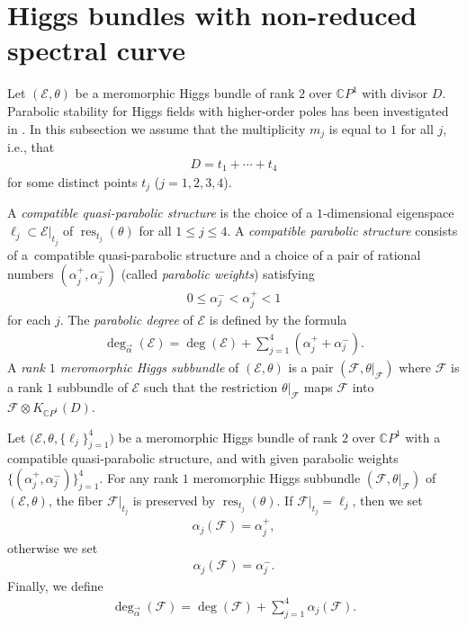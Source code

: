 \documentclass[10pt,a4paper]{amsart}
\newcommand{\CP}[1]{\mathbb{C}P^{#1}} %
\newcommand{\E}{{\mathcal E}} %
\newcommand{\F}{{\mathcal F}} %
\newcommand{\pardeg}{\deg_{\vec{\alpha}}}
\DeclareMathOperator{\res}{res}
\numberwithin{equation}{section}
\begin{document}
\section{Higgs bundles with non-reduced spectral curve}\label{s:parabolic}

Let $(\E , \theta)$ be a meromorphic Higgs bundle of rank $2$ over
$\CP1$ with divisor $D$. Parabolic stability for Higgs fields with
higher-order poles has been investigated in
\cite{ISS, ISS2}. In this subsection we assume that the multiplicity
$m_j$ is equal to $1$ for all $j$, i.e., that
\begin{gather*}
 D = t_1 + \cdots + t_4
\end{gather*}
for some distinct points $t_j$ ($j=1,2,3,4$).
\begin{defn}
 A {\it compatible quasi-parabolic structure} is the choice of a $1$-dimensional eigen\-space $\ell_j \subset \E|_{t_j}$ of $\res_{t_j} (\theta )$ for all $1 \leq j \leq 4$.
 A {\it compatible parabolic structure} consists of a~compatible quasi-parabolic structure and a choice of a pair of rational numbers $(\alpha_j^+, \alpha_j^-)$
 (called {\it parabolic weights}) satisfying
 \begin{gather*}
 0 \leq \alpha_j^- < \alpha_j^+ < 1
 \end{gather*}
 for each $j$. The {\it parabolic degree} of $\E$ is defined by the formula
 \begin{gather*}
 \pardeg (\E ) = \deg (\E ) + \sum_{j=1}^4 (\alpha_j^+ + \alpha_j^-).
 \end{gather*}
 A {\it rank $1$ meromorphic Higgs subbundle} of $(\E ,\theta )$ is a pair $(\F , \theta|_{\F})$ where $\F$ is a rank $1$ subbundle of $\E$ such that the restriction
 $\theta|_{\F}$ maps $\F$ into $\F \otimes K_{\CP1}(D)$.
 \end{defn}

Let $\big(\E , \theta, \{ \ell_j \}_{j=1}^4\big)$ be a meromorphic Higgs
 bundle of rank $2$ over $\CP1$ with a compatible quasi-parabolic
 structure, and with given parabolic weights $\{ (\alpha_j^+,
 \alpha_j^-) \}_{j=1}^4$. For any rank $1$ meromorphic Higgs
 subbundle $(\F , \theta|_{\F})$ of $(\E ,\theta )$, the fiber
 $\F|_{t_j}$ is preserved by $\res_{t_j}(\theta )$. If $\F|_{t_j} = \ell_j$, then we set
 \begin{gather*}%
 \alpha_j(\F ) = \alpha_j^+,
 \end{gather*}
 otherwise we set
 \begin{gather*}
 \alpha_j(\F ) = \alpha_j^-.
 \end{gather*}
 Finally, we define
 \begin{gather*}
 \pardeg (\F ) = \deg (\F ) + \sum_{j=1}^4 \alpha_j(\F ).
 \end{gather*}
\end{document}
